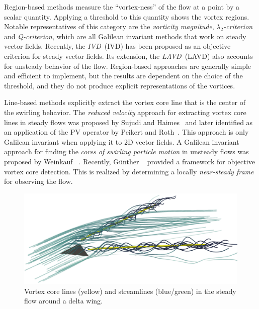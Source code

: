 %
Region-based methods measure the ``vortex-ness'' of the flow at a point by a
scalar quantity.
%
Applying a threshold to this quantity shows the vortex regions.
%
Notable representatives of this category are the \emph{vorticity magnitude},
\emph{$\lambda_2$-criterion} and \emph{Q-criterion}, which are all Galilean
invariant methods that work on steady vector fields.
%
Recently, the \emph{\acl{IVD}}~(\acs{IVD}) has been proposed as an objective
criterion for steady vector fields.
%
Its extension, the \emph{\acl{LAVD}}~(\acs{LAVD}) also accounts for unsteady
behavior of the flow.
%
Region-based approaches are generally simple and efficient to implement, but the
results are dependent on the choice of the threshold, and they do not produce
explicit representations of the vortices.
%

%
Line-based methods explicitly extract the vortex core line that is the center
of the swirling behavior.
%
The \emph{reduced velocity} approach for extracting vortex core lines in steady
flows was proposed by Sujudi and Haimes~\cite{Sujudi1995} and later identified
as an application of the \ac{PV} operator by Peikert and
Roth~\cite{Peikert1999}.
%
This approach is only Galilean invariant when applying it to \ac{2D} vector
fields.
%
A Galilean invariant approach for finding the \emph{cores of swirling particle
motion} in unsteady flows was proposed by Weinkauf \etal{}~\cite{Weinkauf2007}.
%
Recently, G\"unther \etal{}~\cite{Guenther2017} provided a framework for
objective vortex core detection.
%
This is realized by determining a locally \emph{near-steady frame} for observing
the flow.
%
\begin{figure}[t]
    \centering
    \includegraphics[width=\linewidth]{figures/DeltaWingStreamlines.png}
    \caption{Vortex core lines (yellow) and streamlines (blue/green) in the
    steady flow around a delta wing.}
    \label{fig:delta_wing_vortex_cores}
\end{figure}
%

%
